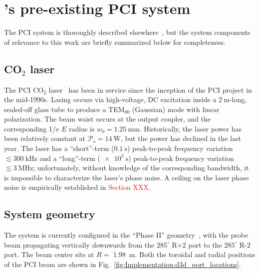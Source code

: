 \section{\diiid's pre-existing PCI system}
\label{sec:Implementation:PCI}
The \diiid \space PCI system is
thoroughly described elsewhere~\cite{dorris_rsi09, dorris_phd}, but
the system components of relevance to this work
are briefly summarized below for completeness.


\subsection{CO$_2$ laser}
\label{sec:Implementation:PCI:laser}
The PCI CO$_2$ laser~\cite[Sec.~3.3]{coda_phd}
has been in service since
the inception of the \diiid\space PCI project in the mid-1990s.
Lasing occurs via high-voltage, DC excitation
inside a $\SI{2}{\meter}$-long, sealed-off glass tube
to produce a TEM$_{00}$ (Gaussian) mode with linear polarization.
The beam waist occurs at the output coupler, and
the corresponding 1/e $E$ radius is $w_0 = \SI{1.25}{\milli\meter}$.
Historically, the laser power has been relatively constant
at $\mathcal{P}_s = \SI{14}{\watt}$, but
the power has declined in the last year.
The laser has
a ``short''-term ($\SI{0.1}{\second}$) peak-to-peak frequency variation
$\lesssim \SI{300}{\kilo\hertz}$ and
a ``long''-term ($\SI{e3}{\second}$) peak-to-peak frequency variation
$\lesssim \SI{3}{\mega\hertz}$;
unfortunately, without knowledge of the corresponding bandwidth,
it is impossible to characterize the laser's phase noise.
A ceiling on the laser phase noise is empirically established in
\textcolor{red}{Section XXX}.


\subsection{System geometry}
\label{sec:Implementation:PCI:geometry}
The system is currently configured
in the ``Phase II'' geometry~\cite{dorris_rsi09},
with the probe beam propagating vertically downwards
from the $285^{\circ}$ R+2 port to the $285^{\circ}$ R-2 port.
The beam center sits at $R = $ \SI{1.98}{\meter}.
Both the toroidal and radial positions
of the PCI beam are shown in
Fig.~\ref{fig:Implementation:d3d_port_locations}.

